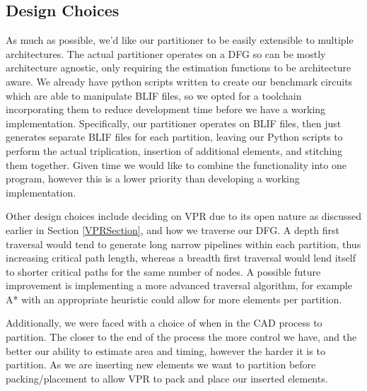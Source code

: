 \documentclass[12pt,drafta4paper,oneside]{memoir} %
\begin{document}
\subsection{Design Choices}
As much as possible, we'd like our partitioner to be easily extensible to multiple architectures. The actual partitioner operates on a \ac{DFG} so can be mostly architecture agnostic, only requiring the estimation functions to be architecture aware.
We already have python scripts written to create our benchmark circuits which are able to manipulate \ac{BLIF} files, so we opted for a toolchain incorporating them to reduce development time before we have a working implementation. Specifically, our partitioner operates on \ac{BLIF} files, then just generates separate \ac{BLIF} files for each partition, leaving our Python scripts to perform the actual triplication, insertion of additional elements, and stitching them together. Given time we would like to combine the functionality into one program, however this is a lower priority than developing a working implementation.

Other design choices include deciding on \ac{VPR} due to its open nature as discussed earlier in Section \ref{VPRSection}, and how we traverse our \ac{DFG}. A depth first traversal would tend to generate long narrow pipelines within each partition, thus increasing critical path length, whereas a breadth first traversal would lend itself to shorter critical paths for the same number of nodes. A possible future improvement is implementing a more advanced traversal algorithm, for example A* with an appropriate heuristic could allow for more elements per partition.

Additionally, we were faced with a choice of when in the \ac{CAD} process to partition. The closer to the end of the process the more control we have, and the better our ability to estimate area and timing, however the harder it is to partition. As we are inserting new elements we want to partition before packing/placement to allow \ac{VPR} to pack and place our inserted elements.
\end{document}
